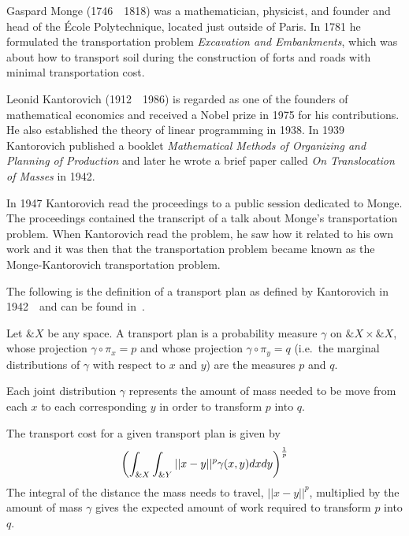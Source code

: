 Gaspard Monge (1746~\textendash~1818) was a mathematician, physicist, and
founder and head of the \'Ecole Polytechnique, located just outside of Paris. In
1781 he formulated the transportation problem \textit{Excavation and
  Embankments}, which was about how to transport soil during the construction of
forts and roads with minimal transportation cost.

Leonid Kantorovich (1912~\textendash~1986) is regarded as one of the founders of
mathematical economics and received a Nobel prize in 1975 for his contributions.
He also established the theory of linear programming in 1938. In 1939
Kantorovich published a booklet \textit{Mathematical Methods of Organizing and
  Planning of Production} and later he wrote a brief paper called \textit{On
  Translocation of Masses} in 1942.

In 1947 Kantorovich read the proceedings to a public session dedicated to Monge.
The proceedings contained the transcript of a talk about Monge's transportation
problem. When Kantorovich read the problem, he saw how it related to his own
work and it was then that the transportation problem became known as the
Monge-Kantorovich transportation problem.

The following is the definition of a transport plan as defined by Kantorovich in
1942~\cite{ref:kantorovich-1942}~and can be found in~\cite{ref:vershik-2013}.

\begin{definition}%
  \label{def:transport-plan}
  Let $\&X$ be any space. A \textnormal{\sffamily transport plan} is a
  probability measure $\gamma$ on $\&X \times \&X$, whose projection $\gamma
  \circ \pi_{x} = p$ and whose projection $\gamma \circ \pi_{y} = q$ (i.e.\ the
  marginal distributions of $\gamma$ with respect to $x$ and $y$) are the
  measures $p$ and $q$.
\end{definition}

\begin{remark}%
  \label{rmrk:mass}
  Each joint distribution $\gamma$ represents the amount of mass needed to be
  move from each $x$ to each corresponding $y$ in order to transform $p$ into
  $q$.
\end{remark}

\begin{definition}%
  \label{def:transport-cost}
  The \textnormal{\sffamily transport cost} for a given transport plan is given
  by
  \begin{align}%
    \label{eq:expected-work}
    \left(\int_{\&X}\int_{\&Y}||x-y||^p\gamma(x, y)dxdy \right)^{1 \over p}
  \end{align}
  The integral of the distance the mass needs to travel, $||x-y||^p$, multiplied
  by the amount of mass $\gamma$ gives the expected amount of work required to
  transform $p$ into $q$.
\end{definition}

